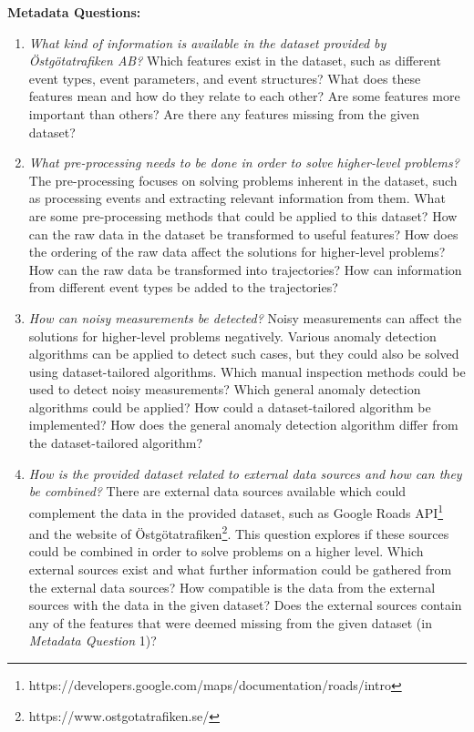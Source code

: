 \begin{description}
  \item \textbf{Metadata Questions:}
  \begin{enumerate}
    \item \textit{What kind of information is available in the dataset provided by Östgötatrafiken AB?} \newline
    Which features exist in the dataset, such as different event types, event parameters, and event structures?
    What does these features mean and how do they relate to each other?
    Are some features more important than others?
    Are there any features missing from the given dataset?
    \item \textit{What pre-processing needs to be done in order to solve higher-level problems?} \newline
    The pre-processing focuses on solving problems inherent in the dataset, such as processing events and extracting relevant information from them.
    What are some pre-processing methods that could be applied to this dataset?
    How can the raw data in the dataset be transformed to useful features?
    How does the ordering of the raw data affect the solutions for higher-level problems?
    How can the raw data be transformed into trajectories?
    How can information from different event types be added to the trajectories?
    \item \textit{How can noisy measurements be detected?} \newline
    Noisy measurements can affect the solutions for higher-level problems negatively.
    Various anomaly detection algorithms can be applied to detect such cases, but they could also be solved using dataset-tailored algorithms.
    Which manual inspection methods could be used to detect noisy measurements?
    Which general anomaly detection algorithms could be applied?
    How could a dataset-tailored algorithm be implemented?
    How does the general anomaly detection algorithm differ from the dataset-tailored algorithm?
    \item \textit{How is the provided dataset related to external data sources and how can they be combined?} \newline
    There are external data sources available which could complement the data in the provided dataset, such as Google Roads API\footnote{https://developers.google.com/maps/documentation/roads/intro} and the website of Östgötatrafiken\footnote{https://www.ostgotatrafiken.se/}.
    This question explores if these sources could be combined in order to solve problems on a higher level.
    Which external sources exist and what further information could be gathered from the external data sources?
    How compatible is the data from the external sources with the data in the given dataset?
    Does the external sources contain any of the features that were deemed missing from the given dataset (in \textit{Metadata Question} 1)? 
  \end{enumerate}


\end{description}
